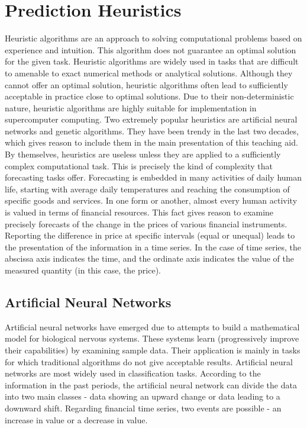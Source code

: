 \newpage
\chapter{Prediction Heuristics}
\label{chapter02}

Heuristic algorithms are an approach to solving computational problems based on experience and intuition. This algorithm does not guarantee an optimal solution for the given task. Heuristic algorithms are widely used in tasks that are difficult to amenable to exact numerical methods or analytical solutions. Although they cannot offer an optimal solution, heuristic algorithms often lead to sufficiently acceptable in practice close to optimal solutions. Due to their non-deterministic nature, heuristic algorithms are highly suitable for implementation in supercomputer computing. Two extremely popular heuristics are artificial neural networks and genetic algorithms. They have been trendy in the last two decades, which gives reason to include them in the main presentation of this teaching aid. By themselves, heuristics are useless unless they are applied to a sufficiently complex computational task. This is precisely the kind of complexity that forecasting tasks offer. Forecasting is embedded in many activities of daily human life, starting with average daily temperatures and reaching the consumption of specific goods and services. In one form or another, almost every human activity is valued in terms of financial resources. This fact gives reason to examine precisely forecasts of the change in the prices of various financial instruments. Reporting the difference in price at specific intervals (equal or unequal) leads to the presentation of the information in a time series. In the case of time series, the abscissa axis indicates the time, and the ordinate axis indicates the value of the measured quantity (in this case, the price).

\section{Artificial Neural Networks}

Artificial neural networks have emerged due to attempts to build a mathematical model for biological nervous systems. These systems learn (progressively improve their capabilities) by examining sample data. Their application is mainly in tasks for which traditional algorithms do not give acceptable results. Artificial neural networks are most widely used in classification tasks. According to the information in the past periods, the artificial neural network can divide the data into two main classes - data showing an upward change or data leading to a downward shift. Regarding financial time series, two events are possible - an increase in value or a decrease in value.

